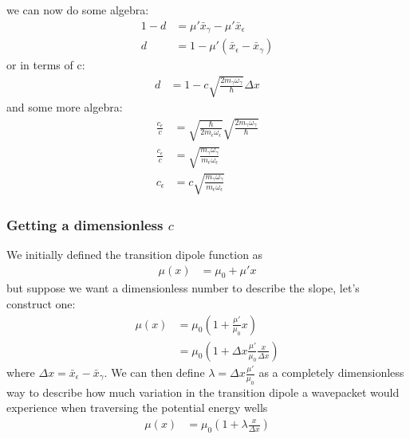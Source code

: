 we can now do some algebra:
\begin{align*}
	1 - d &= \mu'   \bar{x}_{\gamma} - \mu'   \bar{x}_{\epsilon}  \\
	d &= 1 - \mu' \left(  \bar{x}_{\epsilon}  -  \bar{x}_{\gamma}  \right)
\end{align*}
or in terms of c:
\begin{align*}
	d &= 1 - c \sqrt{\frac{2 m_{\gamma} \omega_{\gamma}}{\hbar}}  \Delta x
\end{align*}
and some more algebra:
\begin{align*}
	\frac{c_{\epsilon}}{c}  &=  \sqrt{\frac{\hbar}{2 m_{\epsilon} \omega_{\epsilon}}}  \sqrt{\frac {2 m_{\gamma} \omega_{\gamma}}{\hbar}} \\
	\frac{c_{\epsilon}}{c}  &=  \sqrt{\frac{m_{\gamma} \omega_{\gamma}}{m_{\epsilon} \omega_{\epsilon}}}\\
	c_{\epsilon}  &=  c \sqrt{\frac{m_{\gamma} \omega_{\gamma}}{m_{\epsilon} \omega_{\epsilon}}}
\end{align*}

\subsubsection{Getting a dimensionless $c$}
We initially defined the transition dipole function as
\begin{align}
	\mu(x) &= \mu_0  + \mu' x
\end{align}
but suppose we want a dimensionless number to describe the slope, let's construct one:
\begin{align}
	\mu(x) &= \mu_0  \left( 1 + \frac{\mu'}{\mu_0} x \right) \\
	&= \mu_0  \left( 1 + \Delta x \frac{\mu'}{\mu_0} \frac{x}{\Delta x} \right)
\end{align}
where $\Delta x = \bar{x}_{\epsilon} - \bar{x}_{\gamma}$.  We can then define $\lambda = \Delta x \frac{\mu'}{\mu_0} $ as a completely dimensionless way to describe how much variation in the transition dipole a wavepacket would experience when traversing the potential energy wells
\begin{align}
	\mu(x) &=  \mu_0  \left( 1 + \lambda \frac{x}{\Delta x} \right)
\end{align}

